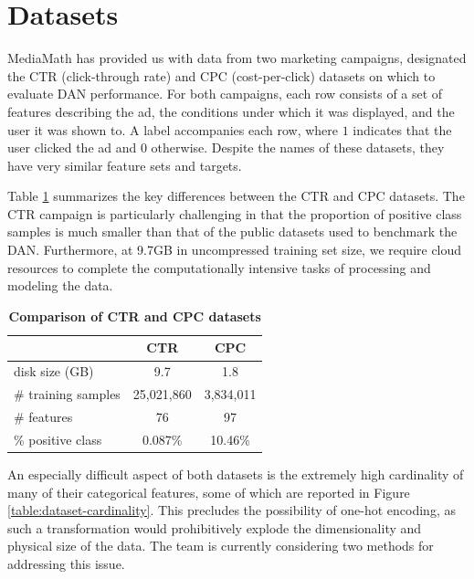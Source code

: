 \documentclass{proc}
\begin{document}
\section{Datasets}

MediaMath has provided us with data from two marketing campaigns, designated the CTR (click-through rate) and CPC (cost-per-click) datasets on which to evaluate DAN performance. For both campaigns, each row consists of a set of features describing the ad, the conditions under which it was displayed, and the user it was shown to. A label accompanies each row, where $1$ indicates that the user clicked the ad and $0$ otherwise. Despite the names of these datasets, they have very similar feature sets and targets.

Table \ref{table:dataset-comparison} summarizes the key differences between the CTR and CPC datasets. The CTR campaign is particularly challenging in that the proportion of positive class samples is much smaller than that of the public datasets used to benchmark the DAN. Furthermore, at 9.7GB in uncompressed training set size, we require cloud resources to complete the computationally intensive tasks of processing and modeling the data.

\begin{table}[]
\begin{center}
	\begin{tabular}{|l|c|c|}
		\hline
 		&  \textbf{CTR} & \textbf{CPC}\\ \hline
 		disk size (GB) & 9.7 & 1.8 \\ \hline
 		\# training samples & 25,021,860 & 3,834,011 \\ \hline
 		\# features & 76 & 97 \\ \hline
 		\% positive class & 0.087\% &  10.46\% \\ \hline
	\end{tabular}
	\caption{\textbf{Comparison of CTR and CPC datasets}}
	\label{table:dataset-comparison}
\end{center}
\end{table}

An especially difficult aspect of both datasets is the extremely high cardinality of many of their categorical features, some of which are reported in Figure \ref{table:dataset-cardinality}. This precludes the possibility of one-hot encoding, as such a transformation would prohibitively explode the dimensionality and physical size of the data. The team is currently considering two methods for addressing this issue.
\end{document}
